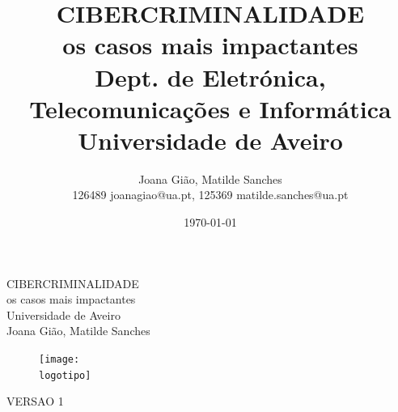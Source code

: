 \documentclass{report}
\begin{document}
%
\def\titulo{CIBERCRIMINALIDADE \\ \Large os casos mais impactantes}
\def\data{DATA}
\def\autores{Joana Gião, Matilde Sanches}
\def\autorescontactos{126489 joanagiao@ua.pt, 125369 matilde.sanches@ua.pt}
\def\versao{VERSAO 1}
\def\departamento{Dept. de Eletrónica, Telecomunicações e Informática}
\def\empresa{Universidade de Aveiro}
\def\logotipo{imagens/ua.pdf}
\def\repo{infor2024-ap-52}
%
%
\begin{titlepage}

\begin{center}
%
\vspace*{50mm}
%
{\Huge \titulo}\\ 
%
\vspace{10mm}
%
{\Large \empresa}\\
%
\vspace{10mm}
%
{\LARGE \autores}\\ 
%
\vspace{30mm}
%
\begin{figure}[h]
\center
\texttt{[image: \\logotipo]}
\end{figure}
%
\vspace{30mm}
\end{center}
%
\begin{flushright}
\versao
\end{flushright}
\end{titlepage}

\title{%
{\Huge\textbf{\titulo}}\\
{\Large \departamento\\ \empresa}
}
%
\author{%
    \autores \\
    \autorescontactos
}
%
\date{\today}
%
\maketitle

\end{document}
